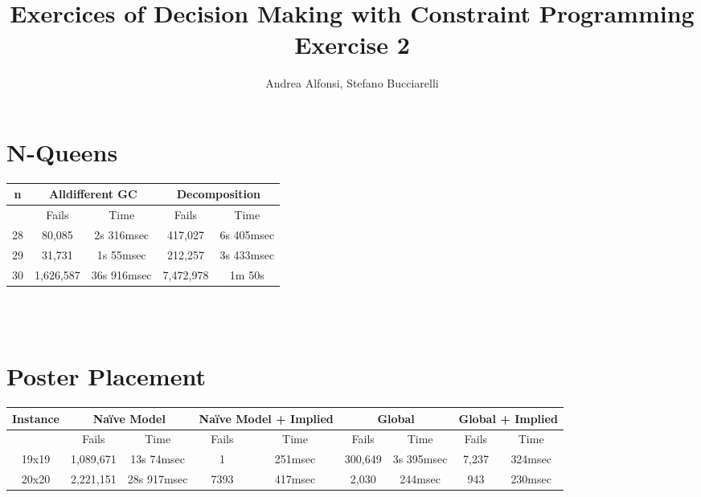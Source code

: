 \documentclass{article}
\title{Exercices of Decision Making with Constraint Programming\\  Exercise 2}
\author{Andrea Alfonsi, Stefano Bucciarelli}
\begin{document}
\maketitle

\section{N-Queens}
\begin{tabular}{||c | c c | c c||} 
 \hline
 n & \multicolumn{2}{c|}{Alldifferent GC} &  \multicolumn{2}{c||}{Decomposition} \\ 
 \hline\hline
   & Fails & Time & Fails & Time\\ 
 \hline
 28 & 80,085 & 2s 316msec & 417,027 & 6s 405msec \\
 \hline
  29 & 31,731 & 1s 55msec & 212,257 & 3s 433msec \\
 \hline
  30 & 1,626,587 & 36s 916msec & 7,472,978 & 1m 50s \\
 \hline

\end{tabular} \\ \\

\section{Poster Placement}
\begin{tabular}{||c | c c | c c | c c | c c ||} 
 \hline
 Instance & \multicolumn{2}{c|}{Naïve Model} & \multicolumn{2}{c|}{Naïve Model + Implied}& \multicolumn{2}{c|}{Global } &  \multicolumn{2}{c||}{Global + Implied} \\ 
 \hline\hline
    & Fails & Time & Fails & Time & Fails & Time & Fails & Time\\ 
 \hline
 19x19 & 1,089,671 & 13s 74msec & 1 & 251msec & 300,649 & 3s 395msec & 7,237 & 324msec\\
 \hline
 20x20 & 2,221,151 & 28s 917msec & 7393 & 417msec & 2,030 & 244msec & 943 
& 230msec \\
 \hline

\end{tabular} \\  \\
\end{document}
